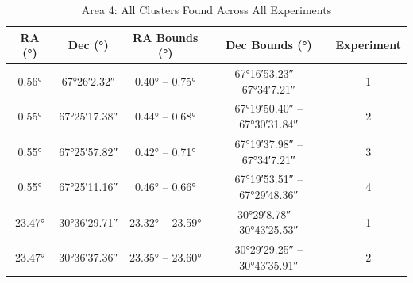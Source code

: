 \begin{table}[H]
    \centering
    \caption{\label{tb:results-raw-a4}Area 4: All Clusters Found Across All Experiments}
    \begin{tabular}{c c c c c}
        \toprule
        RA (°)                                & Dec (°)                                      & RA Bounds (°)                                                                  & Dec Bounds (°)                                                                               & Experiment \\
        \midrule
        \ang[minimum-integer-digits=2]{0.56}  & \ang[minimum-integer-digits=2]{+67;26;2.32}  & \ang[minimum-integer-digits=2]{0.40} -- \ang[minimum-integer-digits=2]{0.75}   & \ang[minimum-integer-digits=2]{+67;16;53.23} -- \ang[minimum-integer-digits=2]{+67;34;7.21}  & 1          \\ %
        \ang[minimum-integer-digits=2]{0.55}  & \ang[minimum-integer-digits=2]{+67;25;17.38} & \ang[minimum-integer-digits=2]{0.44} -- \ang[minimum-integer-digits=2]{0.68}   & \ang[minimum-integer-digits=2]{+67;19;50.40} -- \ang[minimum-integer-digits=2]{+67;30;31.84} & 2          \\ %
        \ang[minimum-integer-digits=2]{0.55}  & \ang[minimum-integer-digits=2]{+67;25;57.82} & \ang[minimum-integer-digits=2]{0.42} -- \ang[minimum-integer-digits=2]{0.71}   & \ang[minimum-integer-digits=2]{+67;19;37.98} -- \ang[minimum-integer-digits=2]{+67;34;7.21}  & 3          \\ %
        \ang[minimum-integer-digits=2]{0.55}  & \ang[minimum-integer-digits=2]{+67;25;11.16} & \ang[minimum-integer-digits=2]{0.46} -- \ang[minimum-integer-digits=2]{0.66}   & \ang[minimum-integer-digits=2]{+67;19;53.51} -- \ang[minimum-integer-digits=2]{+67;29;48.36} & 4          \\ %
        \ang[minimum-integer-digits=2]{23.47} & \ang[minimum-integer-digits=2]{+30;36;29.71} & \ang[minimum-integer-digits=2]{23.32} -- \ang[minimum-integer-digits=2]{23.59} & \ang[minimum-integer-digits=2]{+30;29;8.78} -- \ang[minimum-integer-digits=2]{+30;43;25.53}  & 1          \\ %
        \ang[minimum-integer-digits=2]{23.47} & \ang[minimum-integer-digits=2]{+30;36;37.36} & \ang[minimum-integer-digits=2]{23.35} -- \ang[minimum-integer-digits=2]{23.60} & \ang[minimum-integer-digits=2]{+30;29;29.25} -- \ang[minimum-integer-digits=2]{+30;43;35.91} & 2          \\ %

\end{tabular}
\end{table}
